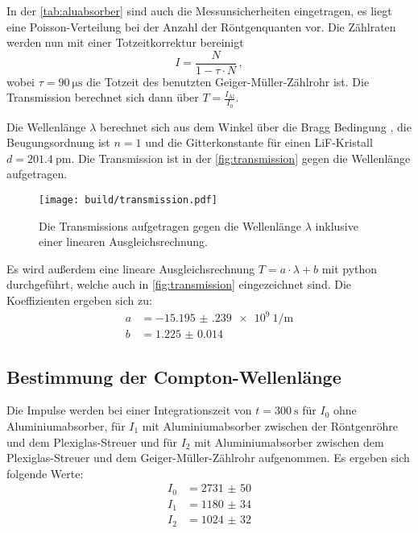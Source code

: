   \noindent In der \autoref{tab:aluabsorber} sind auch die Messunsicherheiten eingetragen, es liegt eine Poisson-Verteilung bei der Anzahl der Röntgenquanten 
  vor. Die Zählraten werden nun mit einer Totzeitkorrektur bereinigt
  \begin{equation*}
    I = \frac{N}{1 - \tau \cdot N} \, , 
  \end{equation*}
  wobei $\tau = \SI{90}{\micro\second}$ die Totzeit des benutzten Geiger-Müller-Zählrohr ist. Die Transmission berechnet sich dann über $T = \frac{I_{\text{Al}}}{I_0}$.

  \noindent Die Wellenlänge $\lambda $ berechnet sich aus dem Winkel über die Bragg Bedingung , die Beugungsordnung ist $n=1$ und die Gitterkonstante für einen 
  LiF-Kristall $d = \SI{201.4}{\pico\metre}$. Die Transmission ist in der \autoref{fig:transmission} gegen die Wellenlänge aufgetragen.

  \begin{figure}[H]
    \centering
    \texttt{[image: build/transmission.pdf]}
    \caption{Die Transmissions aufgetragen gegen die Wellenlänge $\lambda$ inklusive einer linearen Ausgleichsrechnung.}
    \label{fig:transmission}
  \end{figure}

  \noindent Es wird außerdem eine lineare Ausgleichsrechnung $T = a \cdot \lambda + b$ mit python durchgeführt, welche auch in \autoref{fig:transmission} eingezeichnet 
  sind. Die Koeffizienten ergeben sich zu:
  \begin{align*}
    a &= \SI{-15.195(239)e9}{1\per\metre}\\
    b &= \num{1.225(14)}
  \end{align*}


\subsection{Bestimmung der Compton-Wellenlänge} %

  Die Impulse werden bei einer Integrationszeit von $ t = \SI{300}{\second}$ für $I_0$ ohne Aluminiumabsorber, für $I_1$ mit Aluminiumabsorber zwischen der 
  Röntgenröhre und dem Plexiglas-Streuer und für $I_2$ mit Aluminiumabsorber zwischen dem Plexiglas-Streuer und dem Geiger-Müller-Zählrohr aufgenommen. 
  Es ergeben sich 
  folgende Werte:
  \begin{align*}
    I_0 &= \num{2731(50)}\\
    I_1 &= \num{1180(34)}\\
    I_2 &= \num{1024(32)}
  \end{align*}

